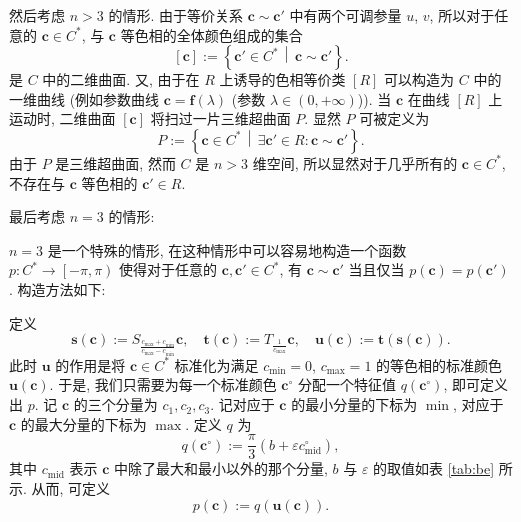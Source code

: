 \documentclass{article}
\begin{document}
然后考虑 $n>3$ 的情形.
由于等价关系 $\mathbf c\sim\mathbf c'$ 中有两个可调参量 $u$, $v$,
所以对于任意的 $\mathbf c\in C^*$,
与 $\mathbf c$ 等色相的全体颜色组成的集合
\begin{equation}
	\left[\mathbf c\right]:=\left\{\mathbf c'\in C^*\,\middle|\,
	\mathbf c\sim\mathbf c'\right\}.
\end{equation}
是 $C$ 中的二维曲面.
又, 由于在 $R$ 上诱导的色相等价类 $\left[R\right]$
可以构造为 $C$ 中的一维曲线
(例如参数曲线 $\mathbf c=\mathbf f\!\left(\lambda\right)$
(参数 $\lambda\in\left(0,+\infty\right)$)).
当 $\mathbf c$ 在曲线 $\left[R\right]$ 上运动时,
二维曲面 $\left[\mathbf c\right]$ 将扫过一片三维超曲面 $P$.
显然 $P$ 可被定义为
\begin{equation}
	P:=\left\{\mathbf c\in C^*\,\middle|\,
	\exists\mathbf c'\in R:\mathbf c\sim\mathbf c'\right\}.
\end{equation}
由于 $P$ 是三维超曲面, 然而 $C$ 是 $n>3$ 维空间,
所以显然对于几乎所有的 $\mathbf c\in C^*$,
不存在与 $\mathbf c$ 等色相的 $\mathbf c'\in R$.

最后考虑 $n=3$ 的情形:

$n=3$ 是一个特殊的情形, 在这种情形中可以容易地构造一个函数
$p:C^*\to\left[-\pi,\pi\right)$
使得对于任意的 $\mathbf c,\mathbf c'\in C^*$,
有 $\mathbf c\sim\mathbf c'$ 当且仅当
$p\!\left(\mathbf c\right)=p\!\left(\mathbf c'\right)$.
构造方法如下:

定义
\begin{equation}
	\mathbf s\!\left(\mathbf c\right):=
	S_\frac{c_{\max}+c_{\min}}{c_{\max}-c_{\min}}\mathbf c,
	\quad\mathbf t\!\left(\mathbf c\right):=
	T_\frac1{c_{\max}}\mathbf c,
	\quad\mathbf u\!\left(\mathbf c\right):=\mathbf t\!\left(\mathbf s\!\left(\mathbf c\right)\right).
	\label{eq:标准化}
\end{equation}
此时 $\mathbf u$ 的作用是将 $\mathbf c\in C^*$ 标准化为满足
$c_{\min}=0$, $c_{\max}=1$ 的等色相的标准颜色
$\mathbf u\!\left(\mathbf c\right)$.
于是, 我们只需要为每一个标准颜色 $\mathbf c^\circ$
分配一个特征值 $q\!\left(\mathbf c^\circ\right)$, 即可定义出 $p$.
记 $\mathbf c$ 的三个分量为 $c_1,c_2,c_3$.
记对应于 $\mathbf c$ 的最小分量的下标为 $\min$,
对应于 $\mathbf c$ 的最大分量的下标为 $\max$.
定义 $q$ 为
\begin{equation}
	q\!\left(\mathbf c^\circ\right):=\frac\pi3\left(b+\varepsilon c^\circ_\mathrm{mid}\right),
\end{equation}
其中 $c_\mathrm{mid}$ 表示 $\mathbf c$ 中除了最大和最小以外的那个分量,
$b$ 与 $\varepsilon$ 的取值如表 \ref{tab:be} 所示.
从而, 可定义
\begin{equation}
	p\!\left(\mathbf c\right):=
	q\!\left(\mathbf u\!\left(\mathbf c\right)\right).
\end{equation}
\end{document}
